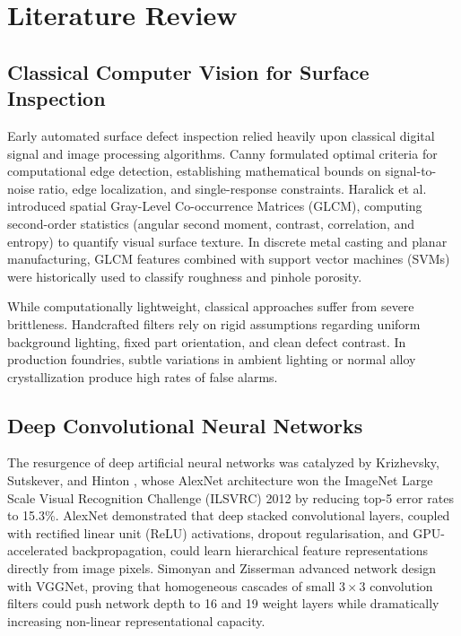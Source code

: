 \documentclass[12pt,a4paper]{report}
\begin{document}
\chapter{Literature Review}

\section{Classical Computer Vision for Surface Inspection}
Early automated surface defect inspection relied heavily upon classical digital signal and image processing algorithms. Canny \cite{canny1986computational} formulated optimal criteria for computational edge detection, establishing mathematical bounds on signal-to-noise ratio, edge localization, and single-response constraints. Haralick et al. \cite{haralick1973textural} introduced spatial Gray-Level Co-occurrence Matrices (GLCM), computing second-order statistics (angular second moment, contrast, correlation, and entropy) to quantify visual surface texture. In discrete metal casting and planar manufacturing, GLCM features combined with support vector machines (SVMs) were historically used to classify roughness and pinhole porosity.

While computationally lightweight, classical approaches suffer from severe brittleness. Handcrafted filters rely on rigid assumptions regarding uniform background lighting, fixed part orientation, and clean defect contrast. In production foundries, subtle variations in ambient lighting or normal alloy crystallization produce high rates of false alarms.

\section{Deep Convolutional Neural Networks}
The resurgence of deep artificial neural networks was catalyzed by Krizhevsky, Sutskever, and Hinton \cite{krizhevsky2012imagenet}, whose AlexNet architecture won the ImageNet Large Scale Visual Recognition Challenge (ILSVRC) 2012 by reducing top-5 error rates to 15.3\%. AlexNet demonstrated that deep stacked convolutional layers, coupled with rectified linear unit (ReLU) activations, dropout regularisation, and GPU-accelerated backpropagation, could learn hierarchical feature representations directly from image pixels. Simonyan and Zisserman \cite{simonyan2015very} advanced network design with VGGNet, proving that homogeneous cascades of small $3 \times 3$ convolution filters could push network depth to 16 and 19 weight layers while dramatically increasing non-linear representational capacity.
\end{document}
